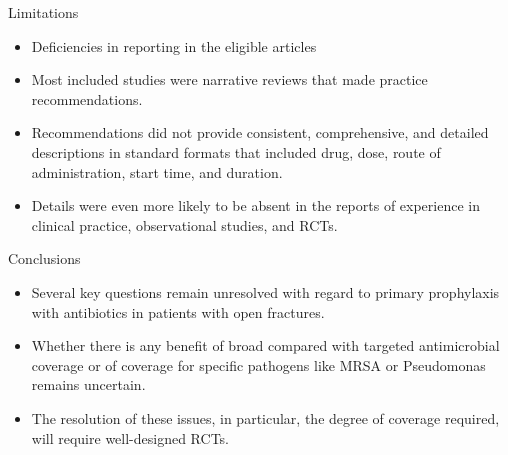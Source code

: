 \documentclass{beamer}
\begin{document}
\begin{frame}{Limitations}
    \begin{itemize}
        \item Deficiencies in reporting in the eligible articles
        \item Most included studies were narrative reviews that made practice
              recommendations.
        \item Recommendations did not provide consistent, comprehensive, and
              detailed descriptions in standard formats that included drug,
              dose, route of administration, start time, and duration.
        \item Details were even more likely to be absent in the reports of
              experience in clinical practice, observational studies, and RCTs.
    \end{itemize}
\end{frame}

\begin{frame}{Conclusions}
    \begin{itemize}
        \item Several key questions remain unresolved with regard to primary
              prophylaxis with antibiotics in patients with open fractures.
        \item Whether there is any benefit of broad compared with targeted
              antimicrobial coverage or of coverage for specific pathogens like
              MRSA or Pseudomonas remains uncertain.
        \item The resolution of these issues, in particular, the degree of
              coverage required, will require well-designed RCTs.
    \end{itemize}
\end{frame}
\end{document}
